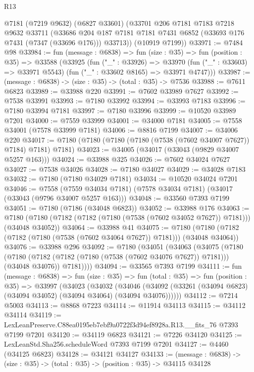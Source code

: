 \begin{lexlean}{R13}
\begin{coremodule}
      @7181
      (@7219 @9632)
      (@6827 @33601)
      (@33701
        @206
        @7181
        @7183
        @7218
        @9632
        @33711
        (@33686 @204 @187 @7181 @7181 @7431 @6852 (@33693 @176 @7431 (@7347 (@33696 @176))) @33713))
      (@10919 @7199))
@33971 := @7484 @98
@33984 := fun (message : @6838) =>
  fun (size : @35) =>
  fun (position : @35) =>
  @33588
    (@33925
      (fun ("_" : @33926) =>
      @33970 (fun ("_" : @33603) => @33971 @5543) (fun ("_" : @33602 @8165) => @33971 @4747)))
@33987 := (message : @6838) -> (size : @35) -> (total : @35) -> @7536
@33988 := @7611 @6823
@33989 := @33988 @220
@33991 := @7602 @33989 @7627
@33992 := @7538 @33991
@33993 := @7180 @33992
@33994 := @33993 @7183
@33996 := @7180 @33994 @7181
@33997 := @7180 @33996
@33999 := @10520 @33989 @7201
@34000 := @7559 @33999
@34001 := @34000 @7181
@34005 := @7558 @34001 (@7578 @33999 @7181)
@34006 := @8816 @7199
@34007 := @34006 @220
@34017 := @7180 (@7180 (@7180 (@7180 (@7538 (@7602 @34007 @7627)) @7184) @7181) @7181)
@34023 := @34005 (@34017 (@33043 (@9829 @34007 @5257 @163)))
@34024 := @33988 @325
@34026 := @7602 @34024 @7627
@34027 := @7538 @34026
@34028 := @7180 @34027
@34029 := @34028 @7183
@34032 := @7180 (@7180 @34029 @7181)
@34034 := @10520 @34024 @7201
@34046 := @7558
    (@7559 @34034 @7181)
    (@7578 @34034 @7181)
    (@34017 (@33043 (@9796 @34007 @5257 @163)))
@34048 := @33560 @7393 @7199
@34051 := @7180 (@7186 (@34048 @6823))
@34052 := @33988 @176
@34063 := @7180 (@7180 (@7182 (@7182 (@7180 (@7538 (@7602 @34052 @7627)) @7181))) (@34048 @34052))
@34064 := @33988 @41
@34075 := @7180 (@7180 (@7182 (@7182 (@7180 (@7538 (@7602 @34064 @7627)) @7181))) (@34048 @34064))
@34076 := @33988 @296
@34092 := @7180
    (@34051
      (@34063
        (@34075
          (@7180
            (@7180 (@7182 (@7182 (@7180 (@7538 (@7602 @34076 @7627)) @7181))) (@34048 @34076))
            @7181))))
@34094 := @33565 @7393 @7199
@34111 := fun (message : @6838) =>
  fun (size : @35) =>
  fun (total : @35) =>
  fun (position : @35) =>
  @33997
    (@34023
      (@34032
        (@34046 (@34092 (@33261 (@34094 @6823) (@34094 @34052) (@34094 @34064) (@34094 @34076))))))
@34112 := @7214 @5003
@34113 := @8868 @7223
@34114 := @11914 @34113
@34115 := @34112 @34114
@34119 := LexLeanPreserve.C88ea0195eb7ebf9a0722f3d94ef8928a.R13.__fits_76 @7393 @7199 @7201
@34120 := @34119 @6823
@34121 := @7226 @34120
@34125 := LexLeanStd.Sha256.scheduleWord @7393 @7199 @7201
@34127 := @4460 (@34125 @6823)
@34128 := @34121 @34127
@34133 := (message : @6838) -> (size : @35) -> (total : @35) -> (position : @35) -> @34115 @34128

\end{coremodule}
\end{lexlean}
